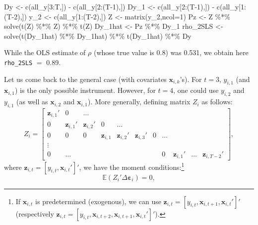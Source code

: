 \documentclass[
  12pt,
]{book}
\newenvironment{Shaded}{\begin{snugshade}}{\end{snugshade}}
\newcommand{\AttributeTok}[1]{\textcolor[rgb]{0.77,0.63,0.00}{#1}}
\newcommand{\DecValTok}[1]{\textcolor[rgb]{0.00,0.00,0.81}{#1}}
\newcommand{\FunctionTok}[1]{\textcolor[rgb]{0.00,0.00,0.00}{#1}}
\newcommand{\NormalTok}[1]{#1}
\newcommand{\OtherTok}[1]{\textcolor[rgb]{0.56,0.35,0.01}{#1}}
\newcommand{\SpecialCharTok}[1]{\textcolor[rgb]{0.00,0.00,0.00}{#1}}
\theoremstyle{definition}
\theoremstyle{definition}
\theoremstyle{definition}
\theoremstyle{definition}
\theoremstyle{remark}
\begin{document}
\begin{Shaded}
\begin{Highlighting}[]
\NormalTok{Dy   }\OtherTok{\textless{}{-}} \FunctionTok{c}\NormalTok{(all\_y[}\DecValTok{3}\SpecialCharTok{:}\NormalTok{T,]) }\SpecialCharTok{{-}} \FunctionTok{c}\NormalTok{(all\_y[}\DecValTok{2}\SpecialCharTok{:}\NormalTok{(T}\DecValTok{{-}1}\NormalTok{),])}
\NormalTok{Dy\_1 }\OtherTok{\textless{}{-}} \FunctionTok{c}\NormalTok{(all\_y[}\DecValTok{2}\SpecialCharTok{:}\NormalTok{(T}\DecValTok{{-}1}\NormalTok{),]) }\SpecialCharTok{{-}} \FunctionTok{c}\NormalTok{(all\_y[}\DecValTok{1}\SpecialCharTok{:}\NormalTok{(T}\DecValTok{{-}2}\NormalTok{),])}
\NormalTok{y\_2  }\OtherTok{\textless{}{-}} \FunctionTok{c}\NormalTok{(all\_y[}\DecValTok{1}\SpecialCharTok{:}\NormalTok{(T}\DecValTok{{-}2}\NormalTok{),])}
\NormalTok{Z }\OtherTok{\textless{}{-}} \FunctionTok{matrix}\NormalTok{(y\_2,}\AttributeTok{ncol=}\DecValTok{1}\NormalTok{)}
\NormalTok{Pz }\OtherTok{\textless{}{-}}\NormalTok{ Z }\SpecialCharTok{\%*\%} \FunctionTok{solve}\NormalTok{(}\FunctionTok{t}\NormalTok{(Z) }\SpecialCharTok{\%*\%}\NormalTok{ Z) }\SpecialCharTok{\%*\%} \FunctionTok{t}\NormalTok{(Z)}
\NormalTok{Dy\_1hat }\OtherTok{\textless{}{-}}\NormalTok{ Pz }\SpecialCharTok{\%*\%}\NormalTok{ Dy\_1}
\NormalTok{rho\_2SLS }\OtherTok{\textless{}{-}} \FunctionTok{solve}\NormalTok{(}\FunctionTok{t}\NormalTok{(Dy\_1hat) }\SpecialCharTok{\%*\%}\NormalTok{ Dy\_1hat) }\SpecialCharTok{\%*\%} \FunctionTok{t}\NormalTok{(Dy\_1hat) }\SpecialCharTok{\%*\%}\NormalTok{ Dy}
\end{Highlighting}
\end{Shaded}

While the OLS estimate of \(\rho\) (whose true value is 0.8) was 0.531, we obtain here \texttt{rho\_2SLS} \(=\) 0.89.

Let us come back to the general case (with covariates \(\mathbf{x}_{i,k}\)'s). For \(t=3\), \(y_{i,1}\) (and \(\mathbf{x}_{i,1}\)) is the only possible instrument. However, for \(t=4\), one could use \(y_{i,2}\) and \(y_{i,1}\) (as well as \(\mathbf{x}_{i,2}\) and \(\mathbf{x}_{i,1}\)). More generally, defining matrix \(Z_i\) as follows:
\[
Z_i = \left[
\begin{array}{ccccccccccccccccc}
\mathbf{z}_{i,1}' & 0 & \dots \\
0 & \mathbf{z}_{i,1}' & \mathbf{z}_{i,2}' & 0 & \dots \\
0 &0 &0 & \mathbf{z}_{i,1} & \mathbf{z}_{i,2}' & \mathbf{z}_{i,3}' & 0 & \dots \\
\vdots \\
0 & \dots &&&&&& 0 & \mathbf{z}_{i,1}' &  \dots &   \mathbf{z}_{i,T-2}'
\end{array}
\right],
\]
where \(\mathbf{z}_{i,t} = [y_{i,t},\mathbf{x}_{i,t}']'\), we have the moment conditions:\footnote{If \(\mathbf{x}_{i,t}\) is predetermined (exogenous), we can use \(\mathbf{z}_{i,t} = [y_{i,t},\mathbf{x}_{i,t+1},\mathbf{x}_{i,t}']'\) (respectively \(\mathbf{z}_{i,t} = [y_{i,t},\mathbf{x}_{i,t+2},\mathbf{x}_{i,t+1},\mathbf{x}_{i,t}']'\)).}
\[
\mathbb{E}(Z_i'\Delta  {\boldsymbol\varepsilon}_i)=0,
\]
\end{document}
